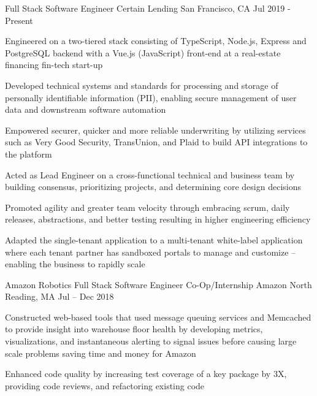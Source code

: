 






\begin{cventries}

  \cventry
     {Full Stack Software Engineer}
     {Certain Lending}
     {San Francisco, CA}
     {Jul 2019 - Present}
     {
       \begin{cvitems}
			\item{Engineered on a two-tiered stack consisting of TypeScript, Node.js, Express and PostgreSQL backend with a Vue.js (JavaScript) front-end at a real-estate financing fin-tech start-up}
			\item{Developed technical systems and standards for processing and storage of personally identifiable information (PII), enabling secure management of user data and downstream software automation}
			\item{Empowered securer, quicker and more reliable underwriting by utilizing services such as Very Good Security, TransUnion, and Plaid to build API integrations to the platform}
   		\item{Acted as Lead Engineer on a cross-functional technical and business team by building consensus, prioritizing projects, and determining core design decisions}
  		\item{Promoted agility and greater team velocity through embracing scrum, daily releases, abstractions, and better testing resulting in higher engineering efficiency}
   		\item{Adapted the single-tenant application to a multi-tenant white-label application where each tenant partner has sandboxed portals to manage and customize -- enabling the business to rapidly scale}
       \end{cvitems}
     }
	 \cventry
    {Amazon Robotics Full Stack Software Engineer Co-Op/Internship} %
    {Amazon} %
    {North Reading, MA} %
    {Jul – Dec 2018} %
    {
    	\begin{cvitems} %
    		    \item {Constructed web-based tools that used message queuing services and Memcached to provide insight into warehouse floor health by developing metrics, visualizations, and instantaneous alerting to signal issues before causing large scale problems saving time and money for Amazon}
    			\item {Enhanced code quality by increasing test coverage of a key package by 3X, providing code reviews, and refactoring existing code}
    		 \end{cvitems}
    }


\end{cventries}
